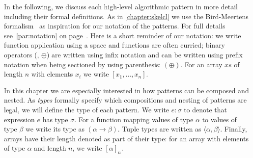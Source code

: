 In the following, we discuss each high-level algorithmic pattern in more detail including their formal definitions.
As in \autoref{chapter:skelcl} we use the Bird-Meertens formalism~\cite{Bird88} as inspiration for our notation of the patterns.
For full details see~\autoref{par:notation} on page~\pageref{par:notation}.
Here is a short reminder of our notation:
we write function application using a space and functions are often curried;
binary operators (\eg, $\oplus$) are written using infix notation and can be written using prefix notation when being sectioned by using parenthesis: $(\oplus)$.
For an array $xs$ of length $n$ with elements $x_i$ we write $[x_1, \ldots, x_n]$.

In this chapter we are especially interested in how patterns can be composed and nested.
As \emph{types} formally specify which compositions and nesting of patterns are legal, we will define the type of each pattern.
We write $e : \sigma$ to denote that expression $e$ has type $\sigma$.
For a function mapping values of type $\alpha$ to values of type $\beta$ we write its type as $(\alpha \rightarrow \beta)$.
Tuple types are written as $\langle\alpha, \beta\rangle$.
Finally, arrays have their length denoted as part of their type:
for an array with elements of type $\alpha$ and length $n$, we write $[\alpha]_n$.


